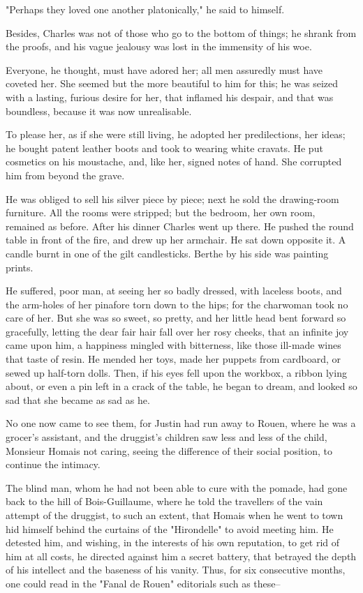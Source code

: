 \documentclass{tufte-book}
\begin{document}
"Perhaps they loved one another platonically," he said to himself.

Besides, Charles was not of those who go to the bottom of things; he
shrank from the proofs, and his vague jealousy was lost in the immensity
of his woe.

Everyone, he thought, must have adored her; all men assuredly must have
coveted her. She seemed but the more beautiful to him for this; he
was seized with a lasting, furious desire for her, that inflamed his
despair, and that was boundless, because it was now unrealisable.

To please her, as if she were still living, he adopted her
predilections, her ideas; he bought patent leather boots and took to
wearing white cravats. He put cosmetics on his moustache, and, like her,
signed notes of hand. She corrupted him from beyond the grave.

He was obliged to sell his silver piece by piece; next he sold the
drawing-room furniture. All the rooms were stripped; but the bedroom,
her own room, remained as before. After his dinner Charles went up
there. He pushed the round table in front of the fire, and drew up her
armchair. He sat down opposite it. A candle burnt in one of the gilt
candlesticks. Berthe by his side was painting prints.

He suffered, poor man, at seeing her so badly dressed, with laceless
boots, and the arm-holes of her pinafore torn down to the hips; for the
charwoman took no care of her. But she was so sweet, so pretty, and her
little head bent forward so gracefully, letting the dear fair hair fall
over her rosy cheeks, that an infinite joy came upon him, a happiness
mingled with bitterness, like those ill-made wines that taste of
resin. He mended her toys, made her puppets from cardboard, or sewed up
half-torn dolls. Then, if his eyes fell upon the workbox, a ribbon lying
about, or even a pin left in a crack of the table, he began to dream,
and looked so sad that she became as sad as he.

No one now came to see them, for Justin had run away to Rouen, where he
was a grocer's assistant, and the druggist's children saw less and less
of the child, Monsieur Homais not caring, seeing the difference of their
social position, to continue the intimacy.

The blind man, whom he had not been able to cure with the pomade, had
gone back to the hill of Bois-Guillaume, where he told the travellers of
the vain attempt of the druggist, to such an extent, that Homais when
he went to town hid himself behind the curtains of the "Hirondelle" to
avoid meeting him. He detested him, and wishing, in the interests of his
own reputation, to get rid of him at all costs, he directed against
him a secret battery, that betrayed the depth of his intellect and the
baseness of his vanity. Thus, for six consecutive months, one could read
in the "Fanal de Rouen" editorials such as these--
\end{document}
